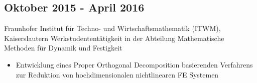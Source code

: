 \documentclass{mycv}
\begin{document}
\begin{paracol}{2}
\subsection{Oktober 2015 - April 2016}{Fraunhofer Institut f{\"u}r Techno-
und Wirtschaftsmathematik (ITWM), Kaiserslautern}
{Werkstudentent{\"a}tigkeit in der Abteilung Mathematische Methoden f{\"u}r Dynamik und
Festigkeit}
	  \begin{itemize}
			\item Entwicklung eines Proper Orthogonal Decomposition basierenden
				Verfahrens zur Reduktion von hochdimensionalen nichtlinearen
				FE Systemen 
		\end{itemize}
\end{paracol}
\end{document}
